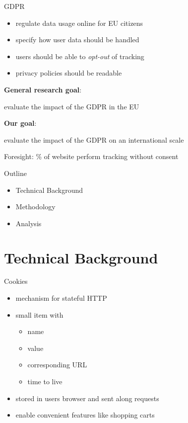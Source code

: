 \documentclass[xcolor={dvipsnames}]{beamer}
\begin{document}
\begin{frame}{GDPR}
	\begin{itemize}
		\item regulate data usage online for EU citizens
        \item specify how user data should be handled
        \item users should be able to \emph{opt-out} of tracking
		\item privacy policies should be readable
	\end{itemize}

    \pause
    \textbf{General research goal}:

    \begin{center}
        evaluate the impact of the GDPR in the EU
    \end{center}

    \pause
    \textbf{Our goal}:

    \begin{center}
        evaluate the impact of the GDPR on an international scale
    \end{center}


    \pause
    Foresight: \% of website perform tracking without consent
\end{frame}

\begin{frame}{Outline}
    \begin{itemize}
        \item Technical Background
        \item Methodology
        \item Analysis
    \end{itemize}
\end{frame}

\section{Technical Background}

\begin{frame}{Cookies}
    \begin{itemize}
        \item mechanism for stateful HTTP
        \item small item with
            \begin{itemize}
                \item name
                \item value
                \item corresponding URL
                \item time to live
            \end{itemize}
        \item stored in users browser and sent along requests
        \item enable convenient features like shopping carts
    \end{itemize}
\end{frame}
\end{document}
